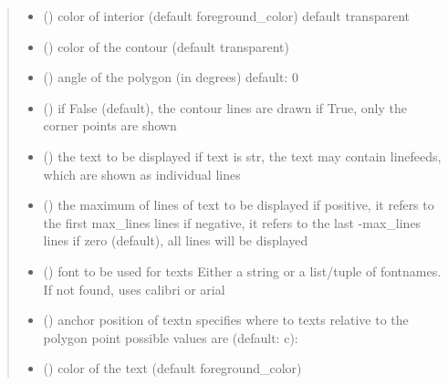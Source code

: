 \documentclass[letterpaper,10pt,english]{sphinxmanual}
\begin{document}
\begin{fulllineitems}
\begin{quote}
\begin{description}
\begin{itemize}
\item {} 
 () \textendash{} color of interior (default foreground\_color) 
default transparent

\item {} 
 () \textendash{} color of the contour (default transparent)

\item {} 
 () \textendash{} angle of the polygon (in degrees) 
default: 0

\item {} 
 () \textendash{} if False (default), the contour lines are drawn 
if True, only the corner points are shown

\item {} 
 (\sphinxstyleliteralemphasis{, }) \textendash{} the text to be displayed 
if text is str, the text may contain linefeeds, which are shown as individual lines

\item {} 
 () \textendash{} the maximum of lines of text to be displayed 
if positive, it refers to the first max\_lines lines 
if negative, it refers to the last -max\_lines lines 
if zero (default), all lines will be displayed

\item {} 
 () \textendash{} font to be used for texts 
Either a string or a list/tuple of fontnames.
If not found, uses calibri or arial

\item {} 
 () \textendash{} anchor position of text\textbar{}n\textbar{}
specifies where to texts relative to the polygon
point 
possible values are (default: c): 

\item {} 
 () \textendash{} color of the text (default foreground\_color)


\end{itemize}
\end{description}
\end{quote}
\end{fulllineitems}
\end{document}
